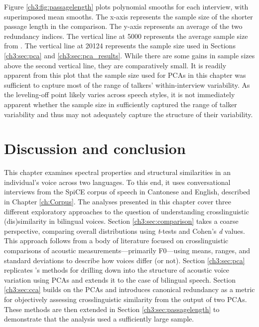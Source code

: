 Figure \ref{ch3:fig:passagelength} plots polynomial smooths for each interview, with superimposed mean smooths. The x-axis represents the sample size of the shorter passage length in the comparison. The y-axis represents an average of the two redundancy indices. The vertical line at 5000 represents the average sample size from \citet{lee_2019_acoustic}. The vertical line at 20124 represents the sample size used in Sections \ref{ch3:sec:pca} and \ref{ch3:sec:pca_results}. While there are some gains in sample sizes above the second vertical line, they are comparatively small. It is readily apparent from this plot that the sample size used for PCAs in this chapter was sufficient to capture most of the range of talkers' within-interview variability. As the leveling-off point likely varies across speech styles, it is not immediately apparent whether the sample size in \citet{lee_2019_acoustic} sufficiently captured the range of talker variability and thus may not adequately capture the structure of their variability. 

\section{Discussion and conclusion}\label{ch3:sec:discussion}

This chapter examines spectral properties and structural similarities in an individual's voice across two languages. To this end, it uses conversational interviews from the SpiCE corpus of speech in Cantonese and English, described in Chapter \ref{ch:Corpus}. The analyses presented in this chapter cover three different exploratory approaches to the question of understanding crosslinguistic (dis)similarity in bilingual voices. Section \ref{ch3:sec:comparison} takes a coarse perspective, comparing overall distributions using \textit{t}-tests and Cohen's \textit{d} values. This approach follows from a body of literature focused on crosslinguistic comparisons of acoustic measurements---primarily F0---using means, ranges, and standard deviations to describe how voices differ (or not). Section \ref{ch3:sec:pca} replicates \citeauthor{lee_2019_acoustic}'s \citeyearpar{lee_2019_acoustic} methods for drilling down into the structure of acoustic voice variation using PCAs and extends it to the case of bilingual speech. Section \ref{ch3:sec:cca} builds on the PCAs and introduces canonical redundancy as a metric for objectively assessing crosslinguistic similarity from the output of two PCAs. These methods are then extended in Section \ref{ch3:sec:passagelength} to demonstrate that the analysis used a sufficiently large sample.

